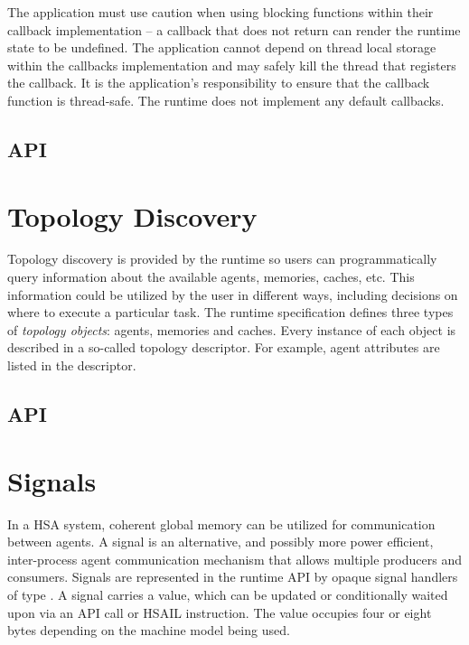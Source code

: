 \documentclass[final]{book}
\begin{document}
The application must use caution when using blocking functions within their
callback implementation -- a callback that does not return can render the
runtime state to be undefined. The application cannot depend on thread local
storage within the callbacks implementation and may safely kill the thread that
registers the callback. It is the application's responsibility to ensure that
the callback function is thread-safe. The runtime does not implement any default
callbacks.

\subsection{API}


\hypertarget{component}{}\section{Topology Discovery}
\label{sec:topology}

Topology discovery is provided by the runtime so users can programmatically
query information about the available agents, memories, caches, etc. This
information could be utilized by the user in different ways, including decisions
on where to execute a particular task. The runtime specification defines three
types of \textit{topology objects}: agents, memories and caches. Every instance
of each object is described in a so-called topology descriptor. For example,
agent attributes are listed in the  descriptor.

\subsection{API}


\section{Signals}\label{sec:signals}

In a HSA system, coherent global memory can be utilized for communication
between agents. A signal is an alternative, and possibly more power efficient,
inter-process agent communication mechanism that allows multiple producers and
consumers. Signals are represented in the runtime API by opaque signal handlers
of type . A signal carries a value, which can be
updated or conditionally waited upon via an API call or HSAIL instruction. The
value occupies four or eight bytes depending on the machine model being used.
\end{document}
